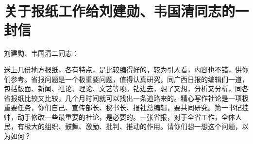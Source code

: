 \section[关于报纸工作给刘建勋、韦国清同志的一封信（一九五八年一月十二日）]{关于报纸工作给刘建勋、韦国清同志的一封信}


刘建勋、韦国清二同志：

送上几份地方报纸，各有特点，是比较编得好的，较为引人看，内容也不错，供你们参考。省报问题是一个极重要问题，值得认真研究，同广西日报的编辑们一道，包括版面、新闻、社论、理论、文艺等项。钻进去，想了又想，分析又分析，同各省报纸比较又比较，几个月时间就可以找出一条道路来的。精心写作社论是一项极重要任务，你们自己、宣传部长、秘书长、报社总编辑，要共同研究。第一书记挂帅，动手修改一些最重要的社论，是必要的。一张省报，对于全省工作，全体人民，有极大的组织、鼓舞、激励、批判、推动的作用。请你们想一想这个问题，以为如何？

